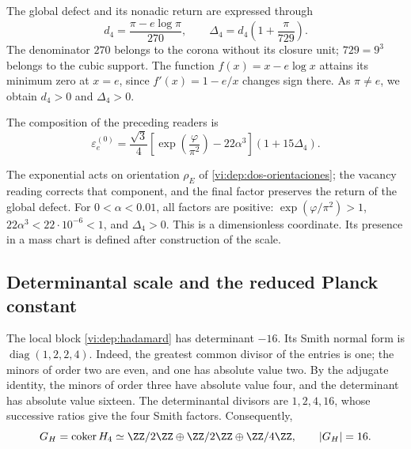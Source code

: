 The global defect and its nonadic return are expressed through
\begin{equation}
 d_4=\frac{\pi-e\log\pi}{270},\qquad
 \Delta_4=d_4\left(1+\frac{\pi}{729}\right).
 \label{vi:dep:delta4}
\end{equation}
The denominator \(270\) belongs to the corona without its closure
unit; \(729=9^3\) belongs to the cubic support. The function
\(f(x)=x-e\log x\) attains its minimum zero at \(x=e\), since
\(f'(x)=1-e/x\) changes sign there. As \(\pi\ne e\),
we obtain \(d_4>0\) and \(\Delta_4>0\).

\begin{definition}
\label{vi:dep:electron-basal}
The composition of the preceding readers is
\begin{equation}
 \varepsilon_e^{(0)}=
 \frac{\sqrt3}{4}
 \left[\exp\left(\frac{\varphi}{\pi^2}\right)-22\alpha^3\right]
 (1+15\Delta_4).
 \label{vi:dep:formula-basal}
\end{equation}
\end{definition}
The exponential acts on orientation \(\rho_E\) of
\eqref{vi:dep:dos-orientaciones}; the vacancy reading corrects that
component, and the final factor preserves the return of the global defect.
For \(0<\alpha<0.01\), all factors are positive:
\(\exp(\varphi/\pi^2)>1\), \(22\alpha^3<22\cdot10^{-6}<1\),
and \(\Delta_4>0\). This is a dimensionless coordinate. Its presence
in a mass chart is defined after construction of the scale.

\subsection{Determinantal scale and the reduced Planck constant}
\label{vi:dep:planck}

The local block \eqref{vi:dep:hadamard} has determinant \(-16\).
Its Smith normal form is \(\operatorname{diag}(1,2,2,4)\).
Indeed, the greatest common divisor of the entries is one; the minors of
order two are even, and one has absolute value two. By the adjugate identity,
the minors of order three have absolute value four,
and the determinant has absolute value sixteen. The determinantal
divisors are \(1,2,4,16\), whose successive ratios give the
four Smith factors. Consequently,
\begin{equation}
 G_H=\operatorname{coker}H_4
 \simeq\ZZ/2\ZZ\oplus\ZZ/2\ZZ\oplus\ZZ/4\ZZ,
 \qquad |G_H|=16.
 \label{vi:dep:conucleo}
\end{equation}

